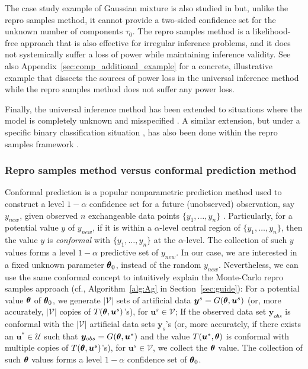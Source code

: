 \documentclass[12pt]{article}
\theoremstyle{shortspace}
\def\*#1{\bm{#1}}
\def\btheta{\mathop{\theta\kern-.45em\hbox{$\theta$}}\nolimits}
\begin{document}
The case study example of Gaussian mixture is also studied in \cite{wasserman2020universal} but, unlike the repro samples method, it cannot provide a two-sided confidence set for the unknown number of components $\tau_0$.
The repro samples method
is a likelihood-free approach that is also effective for irregular inference problems, and it does not systemically suffer a loss of power while maintaining inference validity. 
See also Appendix~\ref{sec:comp_additional_example} for a concrete,  illustrative example that dissects the sources of power loss in the universal inference method while the repro samples method does not suffer any power loss.

Finally, the universal inference method has been extended to situations where the model is completely unknown and misspecified \cite{park2023robust}. A similar extension, but under a specific binary classification situation , has also been done within the repro samples framework \cite{hou2025repro}.

\subsubsection{ Repro samples method versus conformal prediction method}\label{sec:conformal}
 Conformal prediction is a popular nonparametric prediction method used to construct a level $1 - \alpha$ confidence set for a future  (unobserved) observation, say $y_{new}$, given observed 
$n$ exchangeable data points $\{y_{1}, \ldots, y_n\}$  \citep{vovk2005algorithmic, shafer2008tutorial}. Particularly, for a potential value $y$ of $y_{new}$, if it is within a $\alpha$-level central region of $\{y_{1}, \ldots, y_n\}$, then the value $y$ is {\it conformal} with $\{y_{1}, \ldots, y_n\}$
 at the $\alpha$-level. The collection of such $y$ values forms a level $1 - \alpha$ predictive set of $y_{new}$. In our case, we are interested in 
 a fixed unknown parameter
$\btheta_0$, instead of the random 
 $y_{new}$. Nevertheless, we can use the same conformal concept to intuitively explain the Monte-Carlo repro samples approach (cf., Algorithm~\ref{alg:Ag} in Section~\ref{sec:guide}): 
 For a potential value $\btheta$ of $\btheta_0$, we 
 generate $|{\mathcal V}|$ sets of artificial data $\*y^s = G(\btheta,\*u^s)$ (or, more accurately,  $|{\mathcal V}|$ copies of $T(\btheta, \*u^s)$'s), for $ \*u^s \in {\mathcal V}$; If the  
 observed data set $\*y_{obs}$ is conformal with the $|{\mathcal V}|$ artificial data sets $\*y_s$'s (or, more accurately, if there exists an $\*u^* \in {\mathcal U}$ such that $\*y_{obs} = G(\btheta, \*u^*)$ and the value $T(\*u^*, \btheta)$
is conformal with multiple copies of $T(\btheta, \*u^s)$'s), for $ \*u^s \in {\mathcal V}$, 
 we collect the $\btheta$ value. The collection of such $\btheta$ values forms a level $1 - \alpha$ confidence set of $\btheta_0$. 
 
\end{document}
